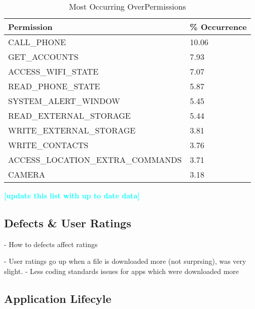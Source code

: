 \documentclass{sig-alternate}
\newcommand{\todo}[1]{\textcolor{cyan}{\textbf{[#1]}}}
\begin{document}
\begin{center}

\begin{table}[ht]
\caption{Most Occurring OverPermissions}
\label{Table:mostoverpermissions}
  \begin{tabular}{ l | l   }

     \bfseries Permission  & \bfseries \% Occurrence \\ \hline
    
	CALL\_PHONE & 10.06 \\ \hline
	GET\_ACCOUNTS & 7.93 \\ \hline
	ACCESS\_WIFI\_STATE & 7.07 \\ \hline
	READ\_PHONE\_STATE & 5.87 \\ \hline
	SYSTEM\_ALERT\_WINDOW & 5.45 \\ \hline
	READ\_EXTERNAL\_STORAGE & 5.44 \\ \hline
	WRITE\_EXTERNAL\_STORAGE & 3.81 \\ \hline
	WRITE\_CONTACTS & 3.76 \\ \hline
	ACCESS\_LOCATION\_EXTRA\_COMMANDS & 3.71 \\ \hline
	CAMERA & 3.18 \\


  \end{tabular}
\end{table}
\end{center}
\todo{update this list with up to date data}





\subsection{Defects \& User Ratings}
- How to defects affect ratings

- User ratings go up when a file is downloaded more (not surprsing), was very slight.
- Less coding standards issues for apps which were downloaded more



\subsection{Application Lifecyle}

\end{document}
